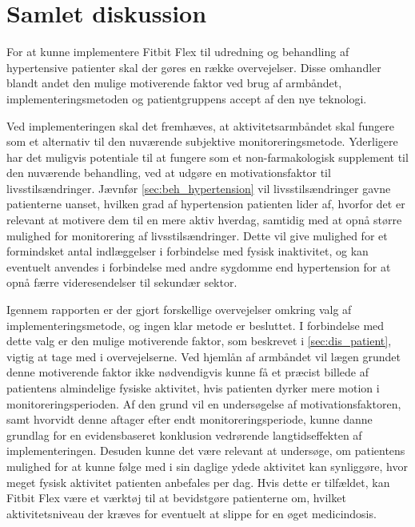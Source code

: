 \section{Samlet diskussion}

For at kunne implementere Fitbit Flex til udredning og behandling af hypertensive patienter skal der gøres en række overvejelser. Disse omhandler blandt andet den mulige motiverende faktor ved brug af armbåndet, implementeringsmetoden og patientgruppens accept af den nye teknologi. 

Ved implementeringen skal det fremhæves, at aktivitetsarmbåndet skal fungere som et alternativ til den nuværende subjektive monitoreringsmetode. Yderligere har det muligvis potentiale til at fungere som et non-farmakologisk supplement til den nuværende behandling, ved at udgøre en motivationsfaktor til livsstilsændringer. Jævnfør \autoref{sec:beh_hypertension} vil livsstilsændringer gavne patienterne uanset, hvilken grad af hypertension patienten lider af, hvorfor det er relevant at motivere dem til en mere aktiv hverdag, samtidig med at opnå større mulighed for monitorering af livsstilsændringer. Dette vil give mulighed for et formindsket antal indlæggelser i forbindelse med fysisk inaktivitet, og kan eventuelt anvendes i forbindelse med andre sygdomme end hypertension for at opnå færre videresendelser til sekundær sektor.

Igennem rapporten er der gjort forskellige overvejelser omkring valg af implementeringsmetode, og ingen klar metode er besluttet. I forbindelse med dette valg er den mulige motiverende faktor, som beskrevet i \autoref{sec:dis_patient}, vigtig at tage med i overvejelserne. Ved hjemlån af armbåndet vil lægen grundet denne motiverende faktor ikke nødvendigvis kunne få et præcist billede af patientens almindelige fysiske aktivitet, hvis patienten dyrker mere motion i monitoreringsperioden. Af den grund vil en undersøgelse af motivationsfaktoren, samt hvorvidt denne aftager efter endt monitoreringsperiode, kunne danne grundlag for en evidensbaseret konklusion vedrørende langtidseffekten af implementeringen. Desuden kunne det være relevant at undersøge, om patientens mulighed for at kunne følge med i sin daglige ydede aktivitet kan synliggøre, hvor meget fysisk aktivitet patienten anbefales per dag. Hvis dette er tilfældet, kan Fitbit Flex være et værktøj til at bevidstgøre patienterne om, hvilket aktivitetsniveau der kræves for eventuelt at slippe for en øget medicindosis. 

